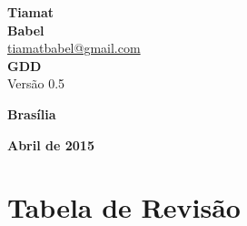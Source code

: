 \documentclass[11pt]{article} %
\begin{document}
\color{white}
\pagestyle{plain}
\def\footnotelayout{\color{white}}
\renewcommand\thefootnote{\textcolor{white}{\arabic{footnote}}}
\begin{titlepage}
 \vfill
  \begin{center}
   {\large \textbf{Tiamat}} \\
   {\large \textbf{Babel}}\\
   {\large \href{mailto:tiamatbabel@gmail.com}{tiamatbabel@gmail.com}}\\[6cm]


   {\Large \textbf{GDD}}\\
   {\Large Versão 0.5}\\[6cm]

   \hspace{.45\textwidth} %
  \vfill

\vspace{2cm}

\large \textbf{Brasília}

\large \textbf{Abril de 2015}
\end{center}
\end{titlepage}
\newpage

\tableofcontents

\newpage


\color{white}

\section*{Tabela de Revisão}
\end{document}
